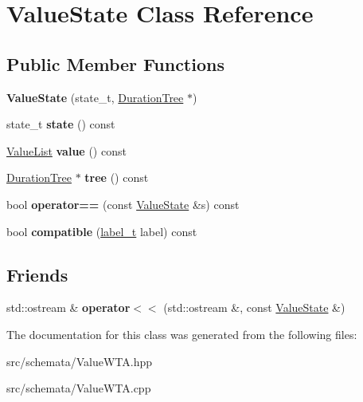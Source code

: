 \hypertarget{classValueState}{}\section{Value\+State Class Reference}
\label{classValueState}
\subsection*{Public Member Functions}
\begin{DoxyCompactItemize}
\item 
{\bfseries Value\+State} (state\+\_\+t, \mbox{\hyperlink{classDurationTree}{Duration\+Tree}} $\ast$)
\item 
\mbox{\label{classValueState_a5654fe3f5d536059e34ec0ab116ee958}} 
state\+\_\+t {\bfseries state} () const
\item 
\mbox{\label{classValueState_af343a6391264cbc3afb17f2383e5f610}} 
\mbox{\hyperlink{classValueList}{Value\+List}} {\bfseries value} () const
\item 
\mbox{\label{classValueState_aa587a09d4f9eb33956dc4b0bc68316d6}} 
\mbox{\hyperlink{classDurationTree}{Duration\+Tree}} $\ast$ {\bfseries tree} () const
\item 
bool {\bfseries operator==} (const \mbox{\hyperlink{classValueState}{Value\+State}} \&s) const
\item 
bool {\bfseries compatible} (\mbox{\hyperlink{group__output_ga22fde970e635fcf63962743b2d5c441d}{label\+\_\+t}} label) const
\end{DoxyCompactItemize}
\subsection*{Friends}
\begin{DoxyCompactItemize}
\item 
\mbox{\label{classValueState_ae62ac6763ab9ddb42d4c2158eacc0535}} 
std\+::ostream \& {\bfseries operator$<$$<$} (std\+::ostream \&, const \mbox{\hyperlink{classValueState}{Value\+State}} \&)
\end{DoxyCompactItemize}


The documentation for this class was generated from the following files\+:\begin{DoxyCompactItemize}
\item 
src/schemata/Value\+W\+T\+A.\+hpp\item 
src/schemata/Value\+W\+T\+A.\+cpp\end{DoxyCompactItemize}
